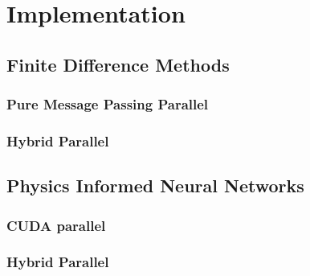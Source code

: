 \section{Implementation}

\subsection{Finite Difference Methods}
\subsubsection{Pure Message Passing Parallel}
\subsubsection{Hybrid Parallel}


\subsection{Physics Informed Neural Networks}
\subsubsection{CUDA parallel}
\subsubsection{Hybrid Parallel}


\subsection{}